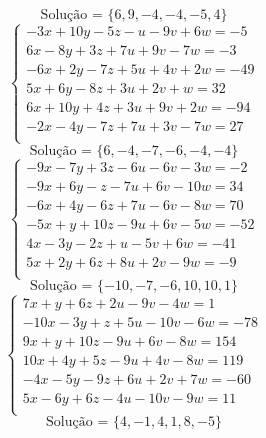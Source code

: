 \documentclass[12pt,oneside,a4paper]{article}
\begin{document}
\begin{equation*}
\text{Solução = }\{6,9,-4,-4,-5,4\}
\end{equation*}
\vspace{\baselineskip}
\begin{equation*}
\begin{cases}
-3x+10y-5z-u-9v+6w=-5 \\
6x-8y+3z+7u+9v-7w=-3 \\
-6x+2y-7z+5u+4v+2w=-49 \\
5x+6y-8z+3u+2v+w=32 \\
6x+10y+4z+3u+9v+2w=-94 \\
-2x-4y-7z+7u+3v-7w=27 \\
\end{cases}
\end{equation*}
\begin{equation*}
\text{Solução = }\{6,-4,-7,-6,-4,-4\}
\end{equation*}
\vspace{\baselineskip}
\begin{equation*}
\begin{cases}
-9x-7y+3z-6u-6v-3w=-2 \\
-9x+6y-z-7u+6v-10w=34 \\
-6x+4y-6z+7u-6v-8w=70 \\
-5x+y+10z-9u+6v-5w=-52 \\
4x-3y-2z+u-5v+6w=-41 \\
5x+2y+6z+8u+2v-9w=-9 \\
\end{cases}
\end{equation*}
\begin{equation*}
\text{Solução = }\{-10,-7,-6,10,10,1\}
\end{equation*}
\vspace{\baselineskip}
\begin{equation*}
\begin{cases}
7x+y+6z+2u-9v-4w=1 \\
-10x-3y+z+5u-10v-6w=-78 \\
9x+y+10z-9u+6v-8w=154 \\
10x+4y+5z-9u+4v-8w=119 \\
-4x-5y-9z+6u+2v+7w=-60 \\
5x-6y+6z-4u-10v-9w=11 \\
\end{cases}
\end{equation*}
\begin{equation*}
\text{Solução = }\{4,-1,4,1,8,-5\}
\end{equation*}
\end{document}
